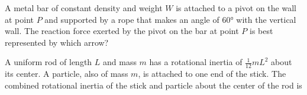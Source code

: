 \documentclass{../../../oss-ap12ibhl-print}
\begin{document}
\begin{questions}
  \vspace{.1in}
  \begin{minipage}{.5\linewidth}
  \end{minipage}
  \begin{minipage}{.2\linewidth}
  \end{minipage}
  
  \question A metal bar of constant density and weight $W$ is attached to a
  pivot on the wall at point $P$ and supported by a rope that makes an angle of
  \ang{60} with the vertical wall. The reaction force exerted by the pivot on
  the bar at point $P$ is best represented by which arrow?

  \begin{minipage}{.3\linewidth}
  \end{minipage}
  \begin{minipage}{.3\linewidth}
    \begin{choices}
      \choice{\Huge $\nearrow$}
      \choice{\Huge $\uparrow$}
      \choice{\Huge $\downarrow$}
      \choice{\Huge $\nwarrow$}
      \choice{\Huge $\searrow$}
    \end{choices}
  \end{minipage}
  
  \question A uniform rod of length $L$ and mass $m$ has a rotational inertia of
  $\displaystyle \frac1{12}mL^2$ about its center. A particle, also of mass
  $m$, is attached to one end of the stick. The combined rotational inertia of
  the stick and particle about the center of the rod is


\end{questions}
\end{document}
